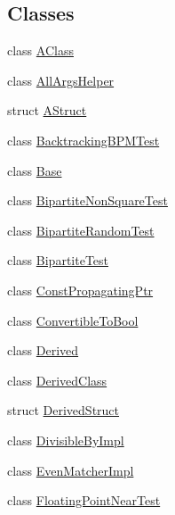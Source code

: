 \subsection*{Classes}
\begin{DoxyCompactItemize}
\item 
class \mbox{\hyperlink{classtesting_1_1gmock__matchers__test_1_1AClass}{A\+Class}}
\item 
class \mbox{\hyperlink{classtesting_1_1gmock__matchers__test_1_1AllArgsHelper}{All\+Args\+Helper}}
\item 
struct \mbox{\hyperlink{structtesting_1_1gmock__matchers__test_1_1AStruct}{A\+Struct}}
\item 
class \mbox{\hyperlink{classtesting_1_1gmock__matchers__test_1_1BacktrackingBPMTest}{Backtracking\+B\+P\+M\+Test}}
\item 
class \mbox{\hyperlink{classtesting_1_1gmock__matchers__test_1_1Base}{Base}}
\item 
class \mbox{\hyperlink{classtesting_1_1gmock__matchers__test_1_1BipartiteNonSquareTest}{Bipartite\+Non\+Square\+Test}}
\item 
class \mbox{\hyperlink{classtesting_1_1gmock__matchers__test_1_1BipartiteRandomTest}{Bipartite\+Random\+Test}}
\item 
class \mbox{\hyperlink{classtesting_1_1gmock__matchers__test_1_1BipartiteTest}{Bipartite\+Test}}
\item 
class \mbox{\hyperlink{classtesting_1_1gmock__matchers__test_1_1ConstPropagatingPtr}{Const\+Propagating\+Ptr}}
\item 
class \mbox{\hyperlink{classtesting_1_1gmock__matchers__test_1_1ConvertibleToBool}{Convertible\+To\+Bool}}
\item 
class \mbox{\hyperlink{classtesting_1_1gmock__matchers__test_1_1Derived}{Derived}}
\item 
class \mbox{\hyperlink{classtesting_1_1gmock__matchers__test_1_1DerivedClass}{Derived\+Class}}
\item 
struct \mbox{\hyperlink{structtesting_1_1gmock__matchers__test_1_1DerivedStruct}{Derived\+Struct}}
\item 
class \mbox{\hyperlink{classtesting_1_1gmock__matchers__test_1_1DivisibleByImpl}{Divisible\+By\+Impl}}
\item 
class \mbox{\hyperlink{classtesting_1_1gmock__matchers__test_1_1EvenMatcherImpl}{Even\+Matcher\+Impl}}
\item 
class \mbox{\hyperlink{classtesting_1_1gmock__matchers__test_1_1FloatingPointNearTest}{Floating\+Point\+Near\+Test}}

\end{DoxyCompactItemize}
